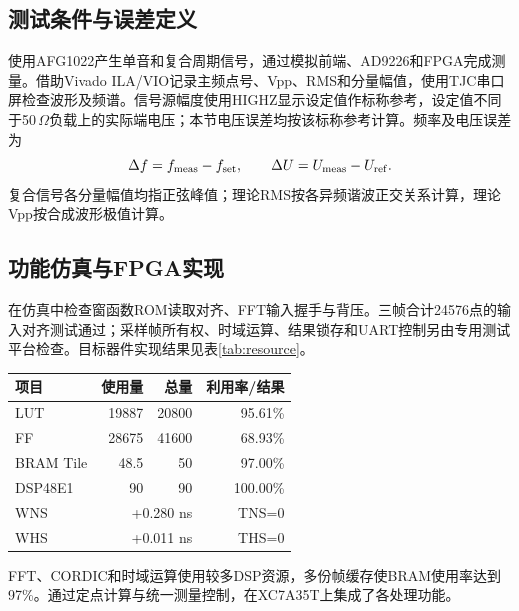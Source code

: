 \documentclass[UTF8,a4paper,12pt,oneside]{ctexart}
\newcommand{\TableStart}{\begingroup\fontsize{9.4pt}{12.8pt}\selectfont\renewcommand{\arraystretch}{1.07}\setlength{\tabcolsep}{4pt}}
\newcommand{\TableEnd}{\endgroup}
\begin{document}
\subsection{测试条件与误差定义}
使用AFG1022产生单音和复合周期信号，通过模拟前端、AD9226和FPGA完成测量。借助Vivado ILA/VIO记录主频点号、Vpp、RMS和分量幅值，使用TJC串口屏检查波形及频谱。信号源幅度使用HIGHZ显示设定值作标称参考，设定值不同于50\,$\Omega$负载上的实际端电压；本节电压误差均按该标称参考计算。频率及电压误差为
\begin{equation}
 \Delta f=f_{\rm meas}-f_{\rm set},\qquad
 \Delta U=U_{\rm meas}-U_{\rm ref}.
\end{equation}
复合信号各分量幅值均指正弦峰值；理论RMS按各异频谐波正交关系计算，理论Vpp按合成波形极值计算。

\subsection{功能仿真与FPGA实现}
在仿真中检查窗函数ROM读取对齐、FFT输入握手与背压。三帧合计24576点的输入对齐测试通过；采样帧所有权、时域运算、结果锁存和UART控制另由专用测试平台检查。目标器件实现结果见表\ref{tab:resource}。
\par\noindent
\begin{minipage}[t]{0.54\linewidth}\vspace{0pt}\centering
{}\label{tab:resource}
\TableStart\setlength{\tabcolsep}{3pt}\begin{tabular}{lrrr}
\toprule 项目 & 使用量 & 总量 & 利用率/结果\\\midrule
LUT & 19887 & 20800 & 95.61\%\\
FF & 28675 & 41600 & 68.93\%\\
BRAM Tile & 48.5 & 50 & 97.00\%\\
DSP48E1 & 90 & 90 & 100.00\%\\\midrule
WNS & \multicolumn{2}{r}{+0.280 ns} & TNS=0\\
WHS & \multicolumn{2}{r}{+0.011 ns} & THS=0\\\bottomrule
\end{tabular}\TableEnd\end{minipage}\hfill
\begin{minipage}[t]{0.43\linewidth}\vspace{0pt}FFT、CORDIC和时域运算使用较多DSP资源，多份帧缓存使BRAM使用率达到97\%。通过定点计算与统一测量控制，在XC7A35T上集成了各处理功能。\end{minipage}\par\medskip
\end{document}
